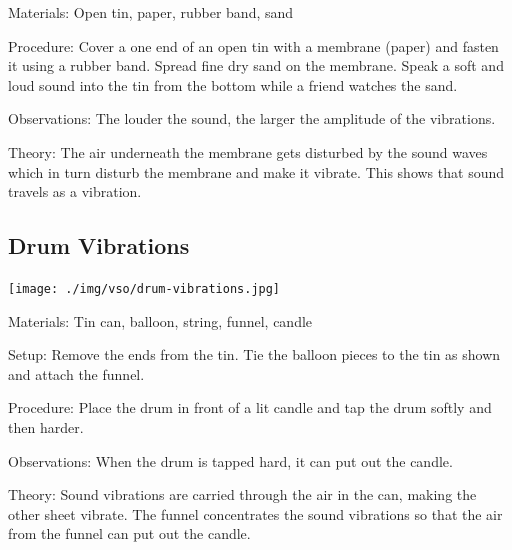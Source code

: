 \begin{multicols}{2}
\begin{description*}
\item[Materials:]{Open tin, paper, rubber band, sand}
\item[Procedure:]{Cover a one end of an open tin with a membrane (paper) and fasten it using a rubber band. Spread fine dry sand on the membrane. Speak a soft and loud sound into the tin from the bottom while a friend watches the sand.}
\item[Observations:]{The louder the sound, the larger the amplitude of the vibrations.}
\item[Theory:]{The air underneath the membrane gets disturbed by the sound waves which in turn disturb the membrane and make it vibrate. This shows that sound travels as a vibration.}
\end{description*}

\columnbreak

\subsection{Drum Vibrations}

\begin{center}
\texttt{[image: ./img/vso/drum-vibrations.jpg]}
\end{center}

\begin{description*}
\item[Materials:]{Tin can, balloon, string, funnel, candle}
\item[Setup:]{Remove the ends from the tin. Tie the balloon pieces to the tin as shown and attach the funnel.}
\item[Procedure:]{Place the drum in front of a lit candle and tap the drum softly and then harder.}
\item[Observations:]{When the drum is tapped hard, it can put out the candle.}
\item[Theory:]{Sound vibrations are carried through the air in the can, making the other sheet vibrate. The funnel concentrates the sound vibrations so that the air from the funnel can put out the candle.}
\end{description*}


\end{multicols}
